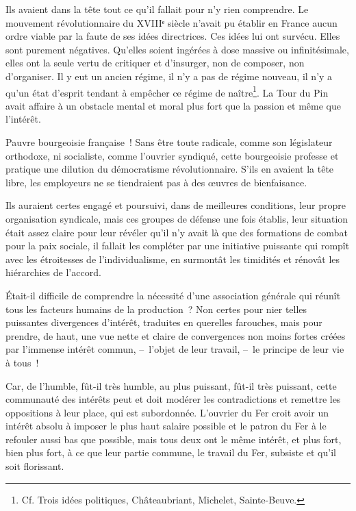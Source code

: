 \documentclass[french,twoside]{book} %
\begin{document}
Ils avaient dans la tête tout ce qu’il fallait pour n’y rien comprendre. Le mouvement révolutionnaire du XVIIIᵉ siècle n’avait pu établir en France aucun ordre viable par la faute de ses idées directrices. Ces idées lui ont survécu. Elles sont purement négatives. Qu’elles soient ingérées à dose massive ou infinitésimale, elles ont la seule vertu de critiquer et d’insurger, non de composer, non d’organiser. Il y eut un ancien régime, il n’y a pas de régime nouveau, il n’y a qu’un état d’esprit tendant à empêcher ce régime de naître\footnote{Cf. Trois idées politiques, Châteaubriant, Michelet, Sainte-Beuve.}. La Tour du Pin avait affaire à un obstacle mental et moral plus fort que la passion et même que l’intérêt.\par
Pauvre bourgeoisie française ! Sans être toute radicale, comme son législateur orthodoxe, ni socialiste, comme l’ouvrier syndiqué, cette bourgeoisie professe et pratique une dilution du démocratisme révolutionnaire. S’ils en avaient la tête libre, les employeurs ne se tiendraient pas à des œuvres de bienfaisance.\par
Ils auraient certes engagé et poursuivi, dans de meilleures conditions, leur propre organisation syndicale, mais ces groupes de défense une fois établis, leur situation était assez claire pour leur révéler qu’il n’y avait là que des formations de combat pour la paix sociale, il fallait les compléter par une initiative puissante qui rompît avec les étroitesses de l’individualisme, en surmontât les timidités et rénovât les hiérarchies de l’accord.\par
Était-il difficile de comprendre la nécessité d’une association générale qui réunît tous les facteurs humains de la production ? Non certes pour nier telles puissantes divergences d’intérêt, traduites en querelles farouches, mais pour prendre, de haut, une vue nette et claire de convergences non moins fortes créées par l’immense intérêt commun, – l’objet de leur travail, – le principe de leur vie à tous !\par
Car, de l’humble, fût-il très humble, au plus puissant, fût-il très puissant, cette communauté des intérêts peut et doit modérer les contradictions et remettre les oppositions à leur place, qui est subordonnée. L’ouvrier du Fer croit avoir un intérêt absolu à imposer le plus haut salaire possible et le patron du Fer à le refouler aussi bas que possible, mais tous deux ont le même intérêt, et plus fort, bien plus fort, à ce que leur partie commune, le travail du Fer, subsiste et qu’il soit florissant.\par
\end{document}
